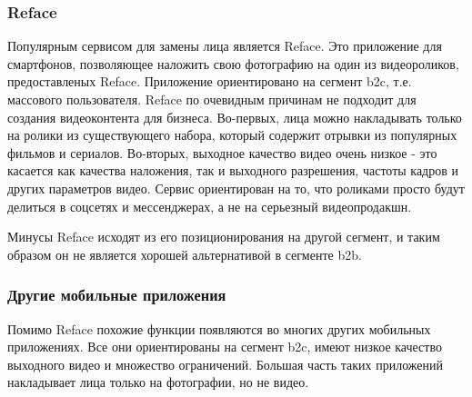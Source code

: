 \subsubsection{Reface}

Популярным сервисом для замены лица является Reface. Это приложение для смартфонов, позволяющее наложить свою фотографию на один из видеороликов, предоставленых Reface.
Приложение ориентировано на сегмент b2c, т.е. массового пользователя. Reface по очевидным причинам не подходит для создания видеоконтента для бизнеса.
Во-первых, лица можно накладывать только на ролики из существующего набора, который содержит отрывки из популярных фильмов и сериалов.
Во-вторых, выходное качество видео очень низкое - это касается как качества наложения, так и выходного разрешения, частоты кадров и других параметров видео.
Сервис ориентирован на то, что роликами просто будут делиться в соцсетях и мессенджерах, а не на серьезный видеопродакшн.

Минусы Reface исходят из его позиционирования на другой сегмент, и таким образом он не является хорошей альтернативой в сегменте b2b.

\subsubsection{Другие мобильные приложения}

Помимо Reface похожие функции появляются во многих других мобильных приложениях. Все они ориентированы на сегмент b2c, имеют низкое качество выходного видео и множество ограничений.
Большая часть таких приложений накладывает лица только на фотографии, но не видео.